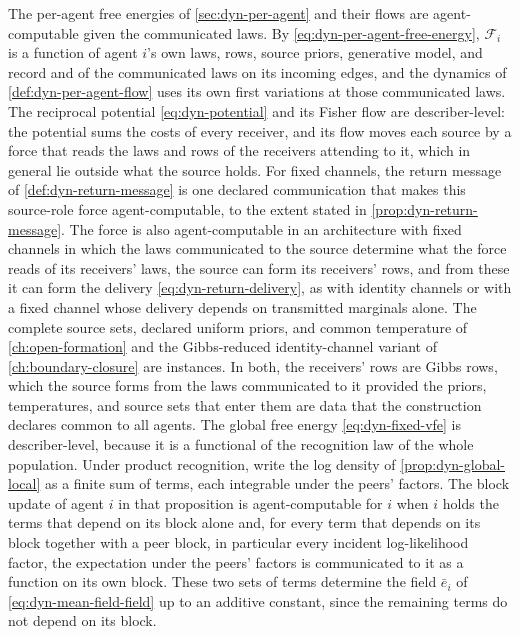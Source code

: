 The per-agent free energies of \cref{sec:dyn-per-agent} and their flows are agent-computable given the communicated laws. By \cref{eq:dyn-per-agent-free-energy}, $\mathcal F_i$ is a function of agent $i$'s own laws, rows, source priors, generative model, and record and of the communicated laws on its incoming edges, and the dynamics of \cref{def:dyn-per-agent-flow} uses its own first variations at those communicated laws. The reciprocal potential \cref{eq:dyn-potential} and its Fisher flow are describer-level: the potential sums the costs of every receiver, and its flow moves each source by a force that reads the laws and rows of the receivers attending to it, which in general lie outside what the source holds. For fixed channels, the return message of \cref{def:dyn-return-message} is one declared communication that makes this source-role force agent-computable, to the extent stated in \cref{prop:dyn-return-message}. The force is also agent-computable in an architecture with fixed channels in which the laws communicated to the source determine what the force reads of its receivers' laws, the source can form its receivers' rows, and from these it can form the delivery \cref{eq:dyn-return-delivery}, as with identity channels or with a fixed channel whose delivery depends on transmitted marginals alone. The complete source sets, declared uniform priors, and common temperature of \cref{ch:open-formation} and the Gibbs-reduced identity-channel variant of \cref{ch:boundary-closure} are instances. In both, the receivers' rows are Gibbs rows, which the source forms from the laws communicated to it provided the priors, temperatures, and source sets that enter them are data that the construction declares common to all agents. The global free energy \cref{eq:dyn-fixed-vfe} is describer-level, because it is a functional of the recognition law of the whole population. Under product recognition, write the log density of \cref{prop:dyn-global-local} as a finite sum of terms, each integrable under the peers' factors. The block update of agent $i$ in that proposition is agent-computable for $i$ when $i$ holds the terms that depend on its block alone and, for every term that depends on its block together with a peer block, in particular every incident log-likelihood factor, the expectation under the peers' factors is communicated to it as a function on its own block. These two sets of terms determine the field $\bar e_i$ of \cref{eq:dyn-mean-field-field} up to an additive constant, since the remaining terms do not depend on its block.

